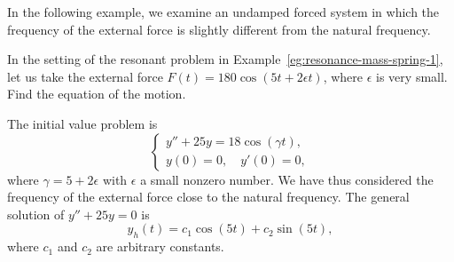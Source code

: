 In the following example, we examine an undamped forced system in which  the frequency of the external force is  slightly different from the natural frequency.


\begin{example}[$b=0, F(t)= F_0 \cos(\gamma t)$ with $\gamma \approx \omega$]\label{eg:resonance-mass-spring-6}
	In the setting of the resonant problem in Example~\ref{eg:resonance-mass-spring-1}, 
let us take the external force  $F(t) = 180 \cos(5t+2\epsilon t)$, where $\epsilon$ is very small.  Find the equation of the motion.
\end{example}

\begin{solution}
	The initial value problem  is
	\begin{equation}\label{eq:small-change-frequency-2}
		\begin{cases}
			y'' +25 y = 18 \cos(\gamma t),\\
			y(0)  =0, \quad y'(0)  = 0,
		\end{cases}
	\end{equation}
	where $\gamma =5+2\epsilon$ with $\epsilon$ a small nonzero number. We have thus considered the frequency of the external force close to the natural frequency. The general solution of $y''+25y =0$ is 
	\[y_h(t) = c_1 \cos(5t) + c_2 \sin(5t),\] where $c_1$ and $c_2$ are arbitrary constants.
	

\end{solution}

